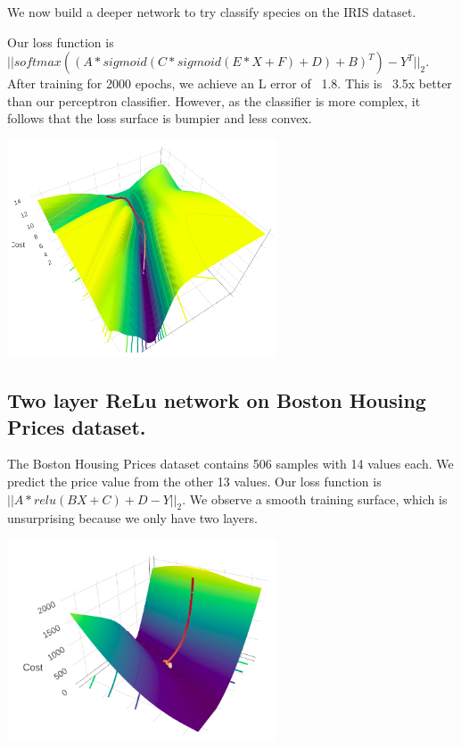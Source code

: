 \documentclass[letterpaper]{article}
\begin{document}
We now build a deeper network to try classify species on the IRIS dataset.

Our loss function is $||softmax((A*sigmoid(C*sigmoid(E*X+F)+D)+B)^T)-Y^T||_2$. After training for 2000 epochs, we achieve an L error of ~1.8. This is ~3.5x better than our perceptron classifier. However, as the classifier is more complex, it follows that the loss surface is bumpier and less convex.

\begin{center}
\includegraphics[width=8cm]{three-sigmoid.png}
\end{center}

\subsection{Two layer ReLu network on Boston Housing Prices dataset.}

The Boston Housing Prices dataset contains 506 samples with 14 values each. We predict the price value from the other 13 values. Our loss function is $||A*relu(BX + C) + D - Y||_2$. We observe a smooth training surface, which is unsurprising because we only have two layers. \\

\begin{center}
\includegraphics[width=8cm]{two-layer-relu-boston-housing.png}
\end{center}
\end{document}
